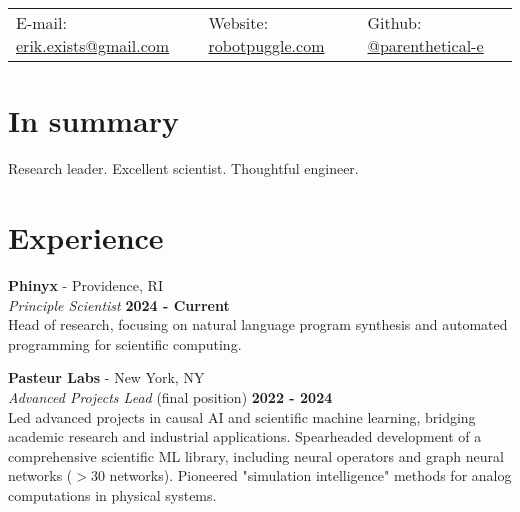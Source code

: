 \documentclass[margin,line]{res}
\begin{document}
\newcommand{\link}[1]{\texttt{#1}}
\providecommand{\tightlist}{%
    \setlength{\itemsep}{0pt}\setlength{\parskip}{0pt}}



\begin{resume}
\section{\sc }
\vspace{.05in}

\begin{tabular}{@{}p{2in}p{2in}p{2in}}
{E-mail:}  {\href{mailto:erik.exists@gmail.com}{erik.exists@gmail.com}} & {Website:} \href{http://robotpuggle.com}{robotpuggle.com} & {Github:} \href{https://github.com/parenthetical-e/}{@parenthetical-e} \\
\end{tabular}

\vspace{-.4cm}
\section{\sc In summary}
Research leader. Excellent scientist. Thoughtful engineer. 


\vspace{-.35cm}
\section{\sc Experience}
{\bf Phinyx} - Providence, RI\\
{\em Principle Scientist} \hfill {\bf 2024 - Current}\\
Head of research, focusing on natural language program synthesis and automated programming for scientific computing.

\vspace{-.25cm}
{\bf Pasteur Labs} - New York, NY\\
{\em Advanced Projects Lead} (final position) \hfill {\bf 2022 - 2024}\\
Led advanced projects in causal AI and scientific machine learning, bridging academic research and industrial applications. Spearheaded development of a comprehensive scientific ML library, including neural operators and graph neural networks ($>$30 networks). Pioneered "simulation intelligence" methods for analog computations in physical systems.


\end{resume}
\end{document}
